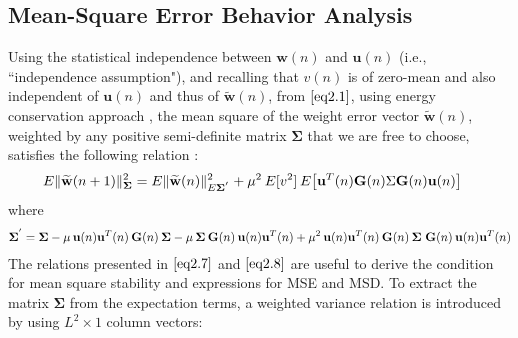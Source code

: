 \documentclass[journal, one column]{IEEEtran}
\begin{document}
\subsection{Mean-Square Error Behavior Analysis}
Using the statistical independence between $\textbf{w}(n)$ and $\textbf{u}(n)$ (i.e., ``independence assumption"), and recalling that $v(n)$ is of zero-mean and also independent of $\textbf{u}(n)$ and thus of $\widetilde{\textbf{w}}(n)$, from $\eqref{eq2.1}$, using energy conservation approach \cite{11}, the mean square of the weight error vector $\widetilde{\textbf{w}}(n)$, weighted by any positive semi-definite matrix $\boldsymbol{\Sigma}$ that we are free to choose, satisfies the following relation :
\begin{equation}\label{eq2.7}
\begin{split}
E\|\widetilde{\textbf{w}}(n+1)\|_{\boldsymbol{\Sigma}}^{2}&= E\|\widetilde{\textbf{w}}(n)\|_{E \boldsymbol{\Sigma}^{'}}^{2}
+ \mu^{2} \hspace{0.2em} E[v^{2}] \hspace{0.2em} E\big[\textbf{u}^{T}(n) \textbf{G}(n) \Sigma \textbf{G}(n) \textbf{u}(n) \big]
\end{split}
\end{equation}
where
\begin{equation}\label{eq2.8}
\begin{split}
\boldsymbol{\Sigma}^{'}&= \boldsymbol{\Sigma} - \mu \hspace{0.2em} \textbf{u}(n) \textbf{u}^{T}(n) \hspace{0.2em} \textbf{G}(n) \hspace{0.2em} \boldsymbol{\Sigma} - \mu \hspace{0.2em} \boldsymbol{\Sigma} \hspace{0.2em} \textbf{G}(n) \hspace{0.2em} \textbf{u}(n) \textbf{u}^{T}(n) + \mu^{2} \hspace{0.2em} \textbf{u}(n) \textbf{u}^{T}(n) \hspace{0.2em} \textbf{G}(n) \hspace{0.2em} \boldsymbol{\Sigma}  \hspace{0.3em} \textbf{G}(n) \hspace{0.2em} \textbf{u}(n) \textbf{u}^{T}(n)\\
\end{split}
\end{equation}
The relations presented in $\eqref{eq2.7}$ and $\eqref{eq2.8}$ are useful to derive the condition for mean square stability and expressions for MSE and MSD. To extract the matrix $\boldsymbol{\Sigma}$ from the expectation terms, a weighted variance relation is introduced by using $L^{2} \times 1$ column vectors:
\end{document}
